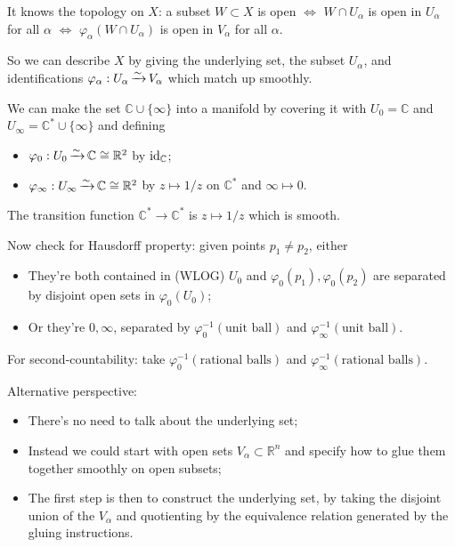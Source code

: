 \documentclass[a4paper,11pt]{article}
\begin{document}
	It knows the topology on $X$: a subset $W \subset X$ is open $\Leftrightarrow$ $W \cap U_\alpha$ is open in $U_\alpha$ for all $\alpha$ $\Leftrightarrow$ $\varphi_\alpha(W\cap U_\alpha)$ is open in $V_\alpha$ for all $\alpha$.

	So we can describe $X$ by giving the underlying set, the subset $U_\alpha$, and identifications $\varphi_\alpha: U_\alpha \operatorname{\xrightarrow{\sim}} V_\alpha$ which match up smoothly.

	\begin{ex}
		We can make the set $\mathbb{C}\cup \{\infty\}$ into a manifold by covering it with $U_0 = \mathbb{C}$ and $U_\infty = \mathbb{C}^* \cup \{\infty\}$ and defining
		\begin{itemize}
			\item $\varphi_0 : U_0 \operatorname{\xrightarrow{\sim}} \mathbb{C} \cong \mathbb{R}^2$ by $\operatorname{id}_{\mathbb{C}}$;
			\item $\varphi_{\infty}: U_\infty \operatorname{\xrightarrow{\sim}} \mathbb{C} \cong \mathbb{R}^2$ by $z \mapsto 1/z$ on $\mathbb{C}^*$ and $\infty \mapsto 0$. 
		\end{itemize}
		The transition function $\mathbb{C}^* \to \mathbb{C}^*$ is $z \mapsto 1/z$ which is smooth.


		Now check for Hausdorff property: given points $p_1 \neq p_2$, either
		\begin{itemize}
			\item They're both contained in (WLOG) $U_0$ and $\varphi_0 (p_1), \varphi_0(p_2)$ are separated by disjoint open sets in $\varphi_0 (U_0)$;
			\item Or they're $0, \infty$, separated by $\varphi_0^{-1}(\text{unit ball})$ and $\varphi_\infty^{-1}(\text{unit ball})$.
		\end{itemize}

		For second-countability: take $\varphi_0^{-1}(\text{rational balls})$ and $\varphi_\infty^{-1}(\text{rational balls})$.
	\end{ex}

	Alternative perspective:
	\begin{itemize}
		\item There's no need to talk about the underlying set;
		\item Instead we could start with open sets $V_\alpha \subset \mathbb{R}^n$ and specify how to glue them together smoothly on open subsets;
		\item The first step is then to construct the underlying set, by taking the disjoint union of the $V_\alpha$ and quotienting by the equivalence relation generated by the gluing instructions.
	\end{itemize}
\end{document}
